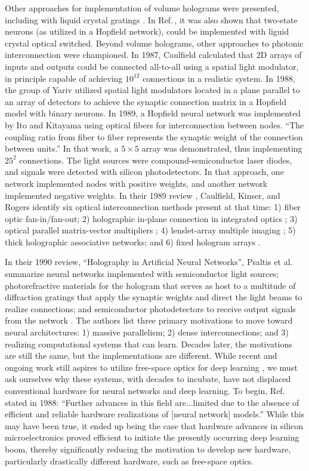 Other approaches for implementation of volume holograms were presented, including with liquid crystal gratings \cite{jaju1988}. In Ref.\,\cite{jaju1988}, it was also shown that two-state neurons (as utilized in a Hopfield network), could be implemented with liguid crystal optical switched. Beyond volume holograms, other approaches to photonic interconnection were championed. In 1987, Caulfield calculated that 2D arrays of inputs and outputs could be connected all-to-all using a spatial light modulator, in principle capable of achieving $10^{12}$ connections in a realistic system. In 1988, the group of Yariv utilized spatial light modulators located in a plane parallel to an array of detectors to achieve the synaptic connection matrix \cite{agne1988} in a Hopfield model with binary neurons. In 1989, a Hopfield neural network was implemented by Ito and Kitayama using optical fibers for interconnection between nodes. ``The coupling ratio from fiber to fiber represents the synaptic weight of the connection between units.'' In that work, a $5\times 5$ array was demonstrated, thus implementing $25^2$ connections. The light sources were compound-semiconductor laser diodes, and signals were detected with silicon photodetectors. In that approach, one network implemented nodes with positive weights, and another network implemented negative weights. In their 1989 review \cite{caki1989}, Caulfield, Kinser, and Rogers identify six optical interconnection methods present at that time: 1) fiber optic fan-in/fan-out; 2) holographic in-plane connection in integrated optics \cite{fees1988}; 3) optical parallel matrix-vector multipliers \cite{faps1985}; 4) lenslet-array multiple imaging \cite{fami1986}; 5) thick holographic associative networks; and 6) fixed hologram arrays \cite{ca1987}.

In their 1990 review, ``Holography in Artificial Neural Networks'', Psaltis et al. summarize neural networks implemented with semiconductor light sources; photorefractive materials for the hologram that serves as host to a multitude of diffraction gratings that apply the synaptic weights and direct the light beams to realize connections; and semiconductor photodetectors to receive output signals from the network \cite{psbr1990}. The authors list three primary motivations to move toward neural architectures: 1) massive parallelism; 2) dense interconnections; and 3) realizing computational systems that can learn. Decades later, the motivations are still the same, but the implementations are different. While recent and ongoing work still aspires to utilize free-space optics for deep learning \cite{}, we must ask ourselves why these systems, with decades to incubate, have not displaced conventional hardware for neural networks and deep learning. To begin, Ref.\,\cite{agne1988} stated in 1988: ``Further advances in this field are...limited due to the absence of efficient and reliable hardware realizations of [neural network] models.'' While this may have been true, it ended up being the case that hardware advances in silicon microelectronics proved efficient to initiate the presently occurring deep learning boom, thereby significantly reducing the motivation to develop new hardware, particularly drastically different hardware, such as free-space optics. 

